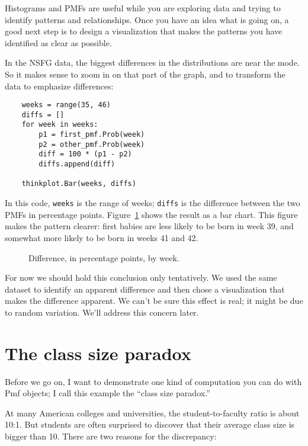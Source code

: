 Histograms and PMFs are useful while you are exploring data and
trying to identify patterns and relationships.
Once you have an idea what is going on, a good next step is to
design a visualization that makes the patterns you have identified
as clear as possible.

In the NSFG data, the biggest differences in the distributions are
near the mode.  So it makes sense to zoom in on that part of the
graph, and to transform the data to emphasize differences:

\begin{verbatim}
    weeks = range(35, 46)
    diffs = []
    for week in weeks:
        p1 = first_pmf.Prob(week)
        p2 = other_pmf.Prob(week)
        diff = 100 * (p1 - p2)
        diffs.append(diff)

    thinkplot.Bar(weeks, diffs)
\end{verbatim}

In this code, {\tt weeks} is the range of weeks; {\tt diffs} is the
difference between the two PMFs in percentage points.
Figure~\ref{probability_nsfg_diffs} shows the result as a bar chart.
This figure makes the pattern clearer: first babies are less likely to
be born in week 39, and somewhat more likely to be born in weeks 41
and 42.

\begin{figure}
\caption{Difference, in percentage points, by week.}
\label{probability_nsfg_diffs}
\end{figure}

For now we should hold this conclusion only tentatively.
We used the same dataset to identify an
apparent difference and then chose a visualization that makes the
difference apparent.  We can't be sure this effect is real;
it might be due to random variation.  We'll address this concern
later.


\section{The class size paradox}

Before we go on, I want to demonstrate
one kind of computation you can do with Pmf objects; I call
this example the ``class size paradox.''

At many American colleges and universities, the student-to-faculty
ratio is about 10:1.  But students are often surprised to discover
that their average class size is bigger than 10.  There
are two reasons for the discrepancy:

